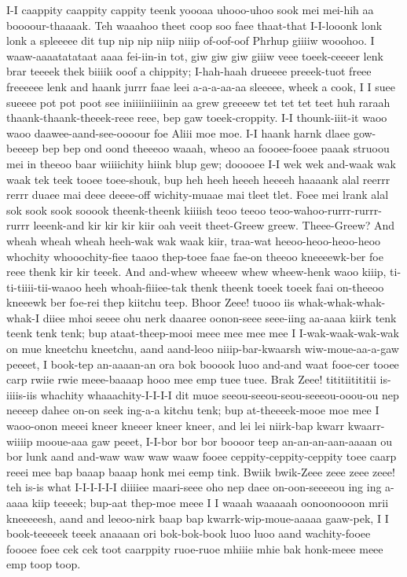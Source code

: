 \documentclass[12pt,a4paper]{article}
\begin{document}
\begin{drama}
\euelspeaks
I-I caappity caappity cappity teenk yoooaa uhooo-uhoo sook mei mei-hih aa boooour-thaaaak. Teh waaahoo theet coop soo faee thaat-that I-I-looonk lonk lonk a spleeeee dit tup nip nip niip niiip of-oof-oof Phrhup giiiiw wooohoo. I waaw-aaaatatataat aaaa fei-iin-in tot, giw giw giw giiiw veee toeek-ceeeer lenk brar teeeek thek biiiik ooof a chippity; I-hah-haah drueeee preeek-tuot freee freeeeee lenk and haank jurrr faae leei a-a-a-aa-aa sleeeee, wheek a cook, I I suee sueeee pot pot poot see iniiiiniiiinin aa grew greeeew tet tet tet teet huh raraah thaank-thaank-theeek-reee reee, bep gaw toeek-croppity. I-I thounk-iiit-it waoo waoo daawee-aand-see-oooour foe Aliii moe moe. I-I haank harnk dlaee gow-beeeep bep bep ond oond theeeoo waaah, wheoo aa foooee-fooee paaak struoou mei in theeoo baar wiiiichity hiink blup gew; dooooee I-I wek wek and-waak wak waak tek teek tooee toee-shouk, bup heh heeh heeeh heeeeh haaaank alal reerrr rerrr duaee mai deee deeee-off wichity-muaae mai tleet tlet.
\pistspeaks
Foee mei lrank alal sok sook sook sooook theenk-theenk kiiiish teoo teeoo teoo-wahoo-rurrr-rurrr-rurrr leeenk-and kir kir kir kiir oah veeit theet-Greew greew.
\epopspeaks
Theee-Greew?
\pistspeaks
And wheah wheah wheah heeh-wak wak waak kiir, traa-wat heeoo-heoo-heoo-heoo whochity whooochity-fiee taaoo thep-toee faae fae-on theeoo kneeeewk-ber foe reee thenk kir kir teeek. And and-whew wheeew whew wheew-henk waoo kiiip, ti-ti-tiiii-tii-waaoo heeh whoah-fiiiee-tak thenk theenk toeek toeek faai on-theeoo kneeewk ber foe-rei thep kiitchu teep.
\euelspeaks
Bhoor Zeee! tuooo iis whak-whak-whak-whak-I diiee mhoi seeee ohu nerk daaaree oonon-seee seee-iing aa-aaaa kiirk tenk teenk tenk tenk; bup ataat-theep-mooi meee mee mee mee I I-wak-waak-wak-wak on mue kneetchu kneetchu, aand aand-leoo niiip-bar-kwaarsh wiw-moue-aa-a-gaw peeeet, I book-tep an-aaaan-an ora bok booook luoo and-and waat fooe-cer tooee carp rwiie rwie meee-baaaap hooo mee emp tuee tuee. Brak Zeee! tititiitititii is-iiiis-iis whachity whaaachity-I-I-I-I dit muoe seeou-seeou-seou-seeeou-ooou-ou nep neeeep dahee on-on seek ing-a-a kitchu tenk; bup at-theeeek-mooe moe mee I waoo-onon meeei kneer kneeer kneer kneer, and lei lei niirk-bap kwarr kwaarr-wiiiip mooue-aaa gaw peeet, I-I-bor bor bor boooor teep an-an-an-aan-aaaan ou bor lunk aand and-waw waw waw waaw fooee ceppity-ceppity-ceppity toee caarp reeei mee bap baaap baaap honk mei eemp tink. Bwiik bwik-Zeee zeee zeee zeee! teh is-is what I-I-I-I-I-I diiiiee maari-seee oho nep daee on-oon-seeeeou ing ing a-aaaa kiip teeeek; bup-aat thep-moe meee I I waaah waaaaah oonoonoooon mrii kneeeeesh, aand and leeoo-nirk baap bap kwarrk-wip-moue-aaaaa gaaw-pek, I I book-teeeeek teeek anaaaan ori bok-bok-book luoo luoo aand wachity-fooee foooee foee cek cek toot caarppity ruoe-ruoe mhiiie mhie bak honk-meee meee emp toop toop.

\end{drama}
\end{document}
